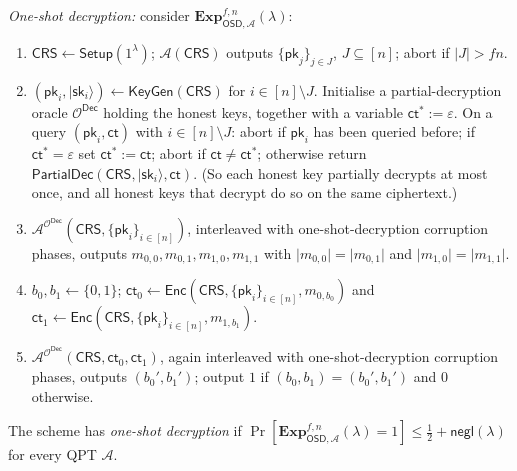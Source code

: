 \documentclass{aicr-conjecture}
\newcommand{\ket}[1]{\lvert #1 \rangle}
\newcommand{\negl}{\mathsf{negl}}
\newcommand{\Setup}{\mathsf{Setup}}
\newcommand{\KeyGen}{\mathsf{KeyGen}}
\newcommand{\Enc}{\mathsf{Enc}}
\newcommand{\Dec}{\mathsf{Dec}}
\newcommand{\PartialDec}{\mathsf{PartialDec}}
\newcommand{\CRS}{\mathsf{CRS}}
\newcommand{\pk}{\mathsf{pk}}
\newcommand{\sk}{\mathsf{sk}}
\newcommand{\ct}{\mathsf{ct}}
\begin{document}
\begin{definition}
\emph{One-shot decryption:} consider
$\mathbf{Exp}^{f,n}_{\mathsf{OSD}, \mathcal{A}}(\lambda)$:
\begin{enumerate}[leftmargin=1.6em]
  \item $\CRS \gets \Setup(1^{\lambda})$; $\mathcal{A}(\CRS)$ outputs
    $\{\pk_{j}\}_{j \in J}$, $J \subseteq [n]$; abort if $\lvert J
    \rvert > f n$.
  \item $(\pk_{i}, \ket{\sk_{i}}) \gets \KeyGen(\CRS)$ for $i \in [n]
    \setminus J$. Initialise a partial-decryption oracle
    $\mathcal{O}^{\Dec}$ holding the honest keys, together with a
    variable $\ct^{*} := \varepsilon$. On a query $(\pk_{i}, \ct)$
    with $i \in [n] \setminus J$: abort if $\pk_{i}$ has been queried
    before; if $\ct^{*} = \varepsilon$ set $\ct^{*} := \ct$; abort if
    $\ct \neq \ct^{*}$; otherwise return $\PartialDec(\CRS,
    \ket{\sk_{i}}, \ct)$. (So each honest key partially decrypts at
    most once, and all honest keys that decrypt do so on the same
    ciphertext.)
  \item $\mathcal{A}^{\mathcal{O}^{\Dec}}(\CRS, \{\pk_{i}\}_{i \in
    [n]})$, interleaved with one-shot-decryption corruption phases,
    outputs $m_{0,0}, m_{0,1}, m_{1,0}, m_{1,1}$ with $\lvert m_{0,0}
    \rvert = \lvert m_{0,1} \rvert$ and $\lvert m_{1,0} \rvert =
    \lvert m_{1,1} \rvert$.
  \item $b_{0}, b_{1} \gets \{0,1\}$; $\ct_{0} \gets \Enc(\CRS,
    \{\pk_{i}\}_{i \in [n]}, m_{0,b_{0}})$ and $\ct_{1} \gets
    \Enc(\CRS, \{\pk_{i}\}_{i \in [n]}, m_{1,b_{1}})$.
  \item $\mathcal{A}^{\mathcal{O}^{\Dec}}(\CRS, \ct_{0}, \ct_{1})$,
    again interleaved with one-shot-decryption corruption phases,
    outputs $(b_{0}', b_{1}')$; output $1$ if $(b_{0}, b_{1}) =
    (b_{0}', b_{1}')$ and $0$ otherwise.
\end{enumerate}
The scheme has \emph{one-shot decryption} if
$\Pr[\mathbf{Exp}^{f,n}_{\mathsf{OSD}, \mathcal{A}}(\lambda) = 1] \le
\tfrac{1}{2} + \negl(\lambda)$ for every QPT $\mathcal{A}$.
\end{definition}
\end{document}

